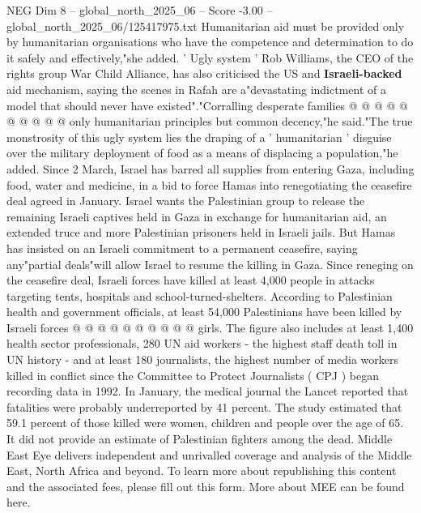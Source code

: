 \begin{textsample}{NEG Dim 8 – global\_north\_2025\_06 – Score -3.00 – global\_north\_2025\_06/125417975.txt}
Humanitarian aid must be provided only by humanitarian organisations who have the competence and determination to do it safely and effectively,"she added. ' Ugly system ' Rob Williams, the CEO of the rights group War Child Alliance, has also criticised the US and \textbf{Israeli-backed} aid mechanism, saying the scenes in Rafah are a"devastating indictment of a model that should never have existed"."Corralling desperate families @ @ @ @ @ @ @ @ @ @ only humanitarian principles but common decency,"he said."The true monstrosity of this ugly system lies the draping of a ' humanitarian ' disguise over the military deployment of food as a means of displacing a population,"he added.
Since 2 March, Israel has barred all supplies from entering Gaza, including food, water and medicine, in a bid to force Hamas into renegotiating the ceasefire deal agreed in January.
Israel wants the Palestinian group to release the remaining Israeli captives held in Gaza in exchange for humanitarian aid, an extended truce and more Palestinian prisoners held in Israeli jails.
But Hamas has insisted on an Israeli commitment to a permanent ceasefire, saying any"partial deals"will allow Israel to resume the killing in Gaza.
Since reneging on the ceasefire deal, Israeli forces have killed at least 4,000 people in attacks targeting tents, hospitals and school-turned-shelters.
According to Palestinian health and government officials, at least 54,000 Palestinians have been killed by Israeli forces @ @ @ @ @ @ @ @ @ @ girls.
The figure also includes at least 1,400 health sector professionals, 280 UN aid workers - the highest staff death toll in UN history - and at least 180 journalists, the highest number of media workers killed in conflict since the Committee to Protect Journalists ( CPJ ) began recording data in 1992.
In January, the medical journal the Lancet reported that fatalities were probably underreported by 41 percent.
The study estimated that 59.1 percent of those killed were women, children and people over the age of 65.
It did not provide an estimate of Palestinian fighters among the dead.
Middle East Eye delivers independent and unrivalled coverage and analysis of the Middle East, North Africa and beyond.
To learn more about republishing this content and the associated fees, please fill out this form.
More about MEE can be found here.

\end{textsample}
